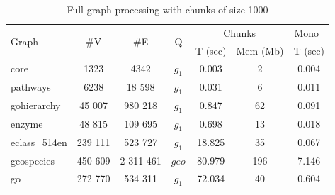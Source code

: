 {\setlength{\tabcolsep}{0.25em}
\begin{table}
{
\caption{Full graph processing with chunks of size 1000}
\label{tbl:redis_full_graph_processing}
\small
{}
\begin{tabular}{|l|c|c|c|c|c|c|}
\hline
\multirow{2}{*}{Graph} & \multirow{2}{*}{\#V} & \multirow{2}{*}{\#E} & \multirow{2}{*}{Q} & \multicolumn{2}{c|}{Chunks}  &  {Mono~\cite{10.1145/3398682.3399163}}  \\
                       &                      &                      &                        & T (sec)  & Mem (Mb) &  T (sec)\\
\hline
\hline
core                   & 1323                 & 4342                 & $g_1$                  & 0.003  & 2                  &  0.004 \\
pathways               & 6238                 & 18 598               & $g_1$                  & 0.031  & 6                  &  0.011 \\
gohierarchy            & 45 007               & 980 218              & $g_1$                  & 0.847  & 62                  &  0.091 \\
enzyme                 & 48 815               & 109 695              & $g_1$                  & 0.698  & 13                  &  0.018 \\
eclass\_514en          & 239 111              & 523 727              & $g_1$                  & 18.825 & 35                   &  0.067 \\
geospecies             & 450 609              & 2 311 461            & $geo$                  & 80.979 & 196                  &  7.146 \\
go                     & 272 770              & 534 311              & $g_1$                  & 72.034 & 40                  &  0.604 \\
\hline
\end{tabular}
}
\end{table}
}

